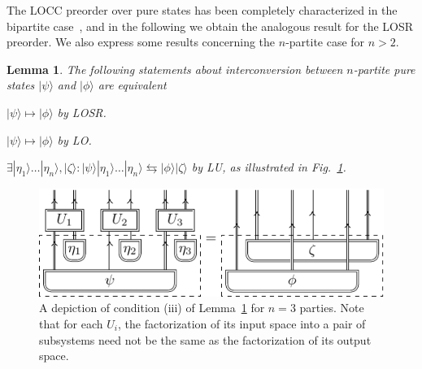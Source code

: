 \documentclass[prx,11pt,letterpaper,twocolumn,accepted=2023-11-27]{quantumarticle}
\theoremstyle{plain}
\newtheorem{lem}[theo]{Lemma}
\theoremstyle{definition}
\begin{document}
The LOCC preorder over pure states has been completely characterized in the bipartite case~\cite{nielsen1999conditions}, and in the following we obtain the analogous result for the LOSR preorder.  We also express some results concerning the  $n$-partite case for $n>2$. 


\begin{samepage}
\begin{lem}
    \label{lem:conversion}
    The following statements about interconversion between $n$-partite pure states $|\psi\rangle$ and $|\phi\rangle$ are equivalent 
    \begin{compactenum}[(i)]
        \item  $|\psi\rangle \mapsto |\phi\rangle$ by LOSR.
        \item  $|\psi\rangle \mapsto |\phi\rangle$ by LO.
        \item  $\exists |\eta_1\rangle \dots |\eta_n\rangle, |\zeta\rangle : |\psi\rangle |\eta_1\rangle \dots |\eta_n\rangle \leftrightarrows
          |\phi\rangle |\zeta\rangle$ by LU, as illustrated in Fig.~\ref{main_Lemma_three_parties}.
    \end{compactenum}
\end{lem}
\end{samepage}

\begin{figure}
\centering
    \includegraphics[scale=1]{fig_losr_as_lu.pdf}
    \caption{A depiction of condition (iii) of Lemma~\ref{lem:conversion} for $n = 3$ parties. 
    Note that for each $U_i$, the factorization of its input space into a pair of subsystems need not be the same as the factorization of its output space.}
    \label{main_Lemma_three_parties}
\end{figure}
\end{document}
